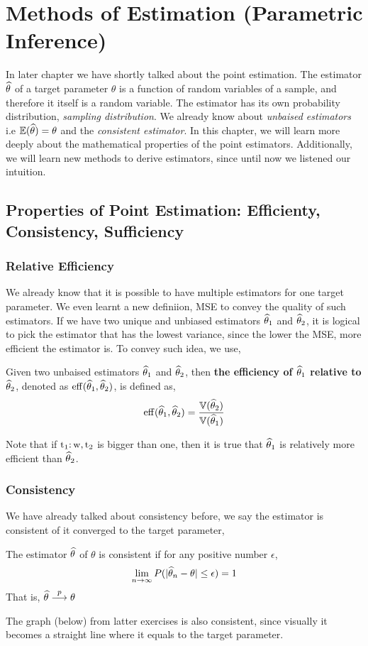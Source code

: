 \chapter{Methods of Estimation (Parametric Inference)}
In later chapter we have shortly talked about the point estimation. The estimator ${\widehat{\theta}}$ of a target parameter $\theta$ is a function of random variables of a sample, and therefore it itself is a random variable.
The estimator has its own probability distribution, \textit{sampling distribution}. We already know about \textit{unbaised estimators} i.e ${\mathbb{E}}({\widehat{\theta}}) = \theta$ and the \textit{consistent estimator}. In this chapter, we will learn more deeply about the mathematical properties of the point estimators. Additionally, we will learn new methods to derive estimators, since until now we listened our intuition.
\section{Properties of Point Estimation: Efficienty, Consistency, Sufficiency}
\subsection*{Relative Efficiency}
We already know that it is possible to have multiple estimators for one target parameter. 
We even learnt a new definiion, MSE to convey the quality of such estimators.
If we have two unique and unbiased estimators ${\widehat{\theta}}_1$ and ${\widehat{\theta}}_2$, it is logical to pick the estimator that has the lowest variance, since the lower the MSE, more efficient the estimator is. To convey such idea, we use, 
\begin{definition}
    Given two unbaised estimators ${\widehat{\theta}}_1$ and ${\widehat{\theta}}_2$, then \textbf{the efficiency of ${\widehat{\theta}}_1$ relative to ${\widehat{\theta}}_2$}, denoted as $\operatorname{eff}({\widehat{\theta}}_1,{\widehat{\theta}}_2)$, is defined as,
    \[ \operatorname{eff}({\widehat{\theta}}_1, {\widehat{\theta}}_2) = \frac{{\mathbb{V}}({\widehat{\theta}}_2)}{{\mathbb{V}}({\widehat{\theta}}_1)} \]

    Note that  if $\operatorname{t_1:w, t_2}$ is bigger than one, then it is true that ${\widehat{\theta}}_1$ is relatively more efficient than ${\widehat{\theta}}_2$.
\end{definition}
\subsection*{Consistency}
We have already talked about consistency before, we say the estimator is consistent of it converged to the target parameter,
\begin{definition}
        The estimator ${\widehat{\theta}}$ of $\theta$ is consistent if for any positive number $\epsilon$,
    \[ \lim_{n \rightarrow \infty} P(| {\widehat{\theta}}_{n} - \theta| \le \epsilon) = 1 \]
        That is, ${\widehat{\theta}} \stackrel{p}{\longrightarrow} \theta$

\end{definition}
The graph (below) from latter exercises is also consistent, since visually it becomes a straight line where it equals to the target parameter.

